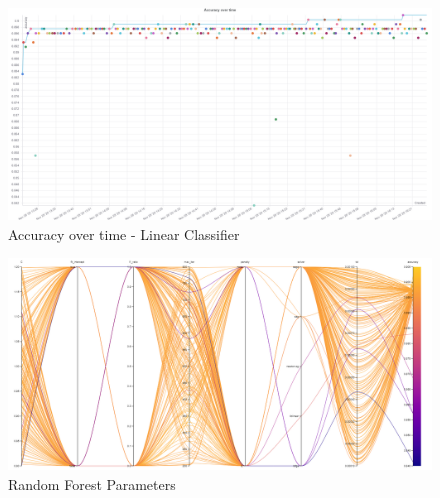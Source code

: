 \documentclass[11pt]{article}
\begin{document}
\begin{appendices}
  \begin{figure}
    \caption {Accuracy over time - Linear Classifier} \label{LCAccOverTime}
    \centering
    \includegraphics[width = \textwidth, height = \textwidth, keepaspectratio]{Images/LC Acc over time.png}
\end{figure}

\begin{figure}
    \caption {Random Forest Parameters} \label{ParallelCoordLC}
    \centering 
    \includegraphics[width = \textwidth, height = \textwidth, keepaspectratio]{Images/LC ParallelCoordGraph.png}
\end{figure}
  \FloatBarrier
\newpage

\end{appendices}
\end{document}
